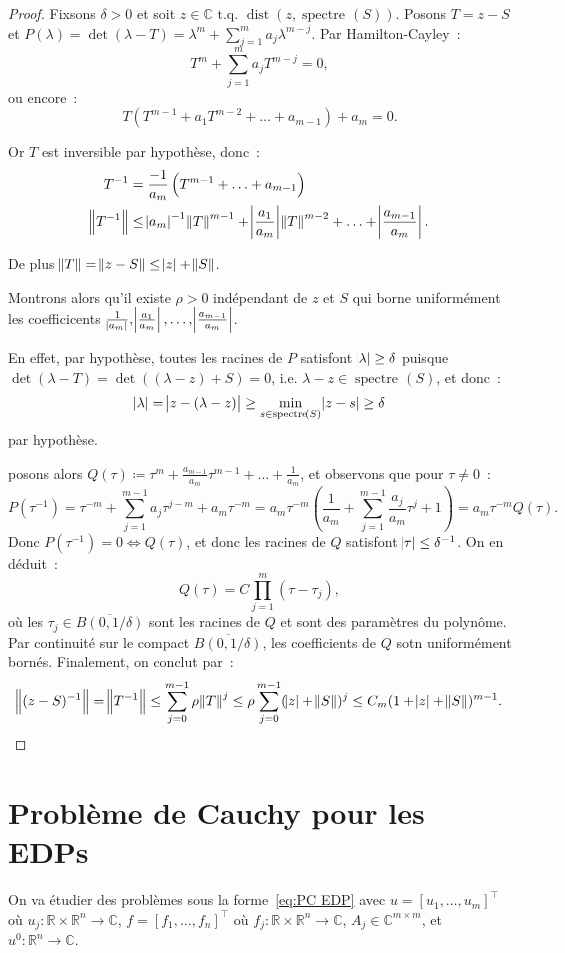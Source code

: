 \documentclass{report}
\DeclareMathOperator{\spectreOperator}{spectre\!}
\DeclareMathOperator{\dist}{dist}
\newcommand{\C}{{\mathbb C}}
\newcommand{\R}{{\mathbb R}}
\newcommand{\tq}{\text{ t.q. }}
\newcommand{\st}{\tq}
\newcommand{\spectre}[1]{{\spectreOperator\left(#1\right)}}
\theoremstyle{definition}
\theoremstyle{remark}
\begin{document}
\begin{proof} Fixsons $\delta > 0$ et soit $z \in \C \st \dist(z, \spectre S)$. Posons $T = z-S$ et $P(\lambda) = \det(\lambda - T) = \lambda^m + \sum_{j=1}^ma_j\lambda^{m-j}$.
Par Hamilton-Cayley~:
\[T^m + \sum_{j=1}^ma_jT^{m-j} = 0,\]
ou encore~:
\[T\left(T^{m-1} + a_1T^{m-2} + \ldots + a_{m-1}\right) + a_m = 0.\]

Or $T$ est inversible par hypothèse, donc~:
\begin{align*}
	T^{-1} &= \frac {-1}{a_m}\left(T^{m-1} + \ldots + a_{m-1}\right) \\
	\norm {T^{-1}} &\leq \abs {a_m}^{-1}\norm T^{m-1} + \abs {\frac {a_1}{a_m}}\norm T^{m-2} + \ldots + \abs {\frac {a_{m-1}}{a_m}}.
\end{align*}

De plus $\norm T = \norm {z-S} \leq \abs z + \norm S$.

Montrons alors qu'il existe $\rho > 0$ indépendant de $z$ et $S$ qui borne uniformément les coefficicents
$\frac 1{\abs {a_m}}, \abs {\frac {a_1}{a_m}}, \ldots, \abs {\frac {a_{m-1}}{a_m}}$.

En effet, par hypothèse, toutes les racines de $P$ satisfont $\abs \lambda \geq \delta$ puisque $\det(\lambda - T) = \det((\lambda-z) + S) = 0$, i.e. $\lambda-z \in \spectre S$,
et donc~:
\[\abs \lambda = \abs {z-(\lambda-z)} \geq \min_{s \in \spectre S}\abs {z-s} \geq \delta\]
par hypothèse.

posons alors $Q(\tau) \coloneqq \tau^m + \frac {a_{m-1}}{a_m}\tau^{m-1} + \ldots + \frac 1{a_m}$, et observons que pour $\tau \neq 0$~:
\[P(\tau^{-1}) = \tau^{-m}+\sum_{j=1}^{m-1}a_j\tau^{j-m} + a_m\tau^{-m} = a_m\tau^{-m}\left(\frac 1{a_m} + \sum_{j=1}^{m-1}\frac {a_j}{a_m}\tau^j + 1\right) = a_m\tau^{-m}Q(\tau).\]
Donc $P(\tau^{-1}) = 0 \iff Q(\tau)$, et donc les racines de $Q$ satisfont $\abs \tau \leq \delta^{-1}$. On en déduit~:
\[Q(\tau) = C\prod_{j=1}^m(\tau-\tau_j),\]
où les $\tau_j \in \overline {B(0, 1/\delta)}$ sont les racines de $Q$ et sont des paramètres du polynôme. Par continuité sur le compact $\overline {B(0, 1/\delta)}$,
les coefficients de $Q$ sotn uniformément bornés. Finalement, on conclut par~:
\[\norm {(z-S)^{-1}} = \norm {T^{-1}} \leq \sum_{j=0}^{m-1}\rho\norm T^j \leq \rho\sum_{j=0}^{m-1}(\abs z + \norm S)^j \leq C_m(1+\abs z + \norm S)^{m-1}.\]
\end{proof}

\section{Problème de Cauchy pour les EDPs}
On va étudier des problèmes sous la forme~\eqref{eq:PC EDP} avec $u = [u_1, \ldots, u_m]^\top$ où $u_j : \R \times \R^n \to \C$, $f = [f_1, \ldots, f_n]^\top$ où
$f_j : \R \times \R^n \to \C$, $A_j \in \C^{m \times m}$, et $u^0 : \R^n \to \C$.
\end{document}
